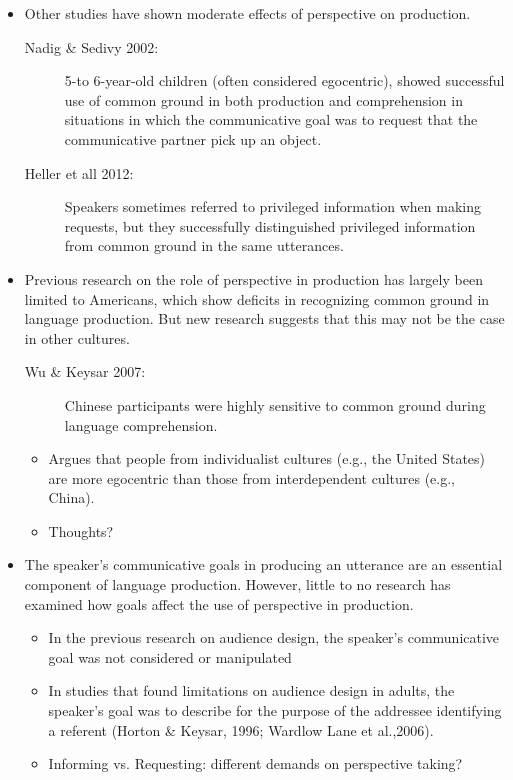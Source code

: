 \documentclass{article}
\begin{document}
\begin{multicols}{2}
\begin{itemize}
\begin{description}
	\end{description}
	\item Other studies have shown moderate effects of perspective on production.
	\begin{description}
		\item[Nadig \& Sedivy 2002:] 5-to 6-year-old children (often considered egocentric), showed successful use of common ground in both production and comprehension in situations in which the communicative goal was to request that the communicative partner pick up an object.
		\item[Heller et all 2012:] Speakers sometimes referred to privileged information when making requests, but they successfully distinguished privileged information from common ground in the same utterances. 
	\end{description}
	\item Previous research on the role of perspective in production has largely been limited to Americans, which show deficits in recognizing common ground in language production. But new research suggests that this may not be the case in other cultures. 
	\begin{description}
		\item[Wu \& Keysar 2007:] Chinese participants were highly sensitive to common ground during language comprehension.
	\end{description}
	\begin{itemize}
		\item Argues that people from individualist cultures (e.g., the United States) are more egocentric than those from interdependent cultures (e.g., China).
		\item Thoughts?
	\end{itemize}
	\item The speaker's communicative goals in producing an utterance are an essential component of language production. However, little to no research has examined how goals affect the use of perspective in production.
	\begin{itemize}
		\item In the previous research on audience design, the speaker's communicative goal was not considered or manipulated
		\item In studies that found limitations on audience design in adults, the speaker's goal was to describe for the purpose of the addressee identifying a referent (Horton \& Keysar, 1996; Wardlow Lane et al.,2006).
		\item Informing vs. Requesting: different demands on perspective taking?
	\end{itemize}
	\end{itemize}

\end{multicols}
\end{document}
